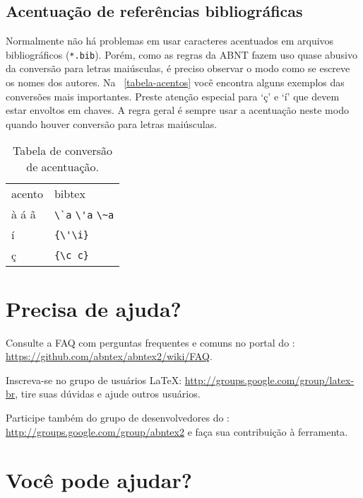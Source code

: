 \subsection{Acentuação de referências bibliográficas}

Normalmente não há problemas em usar caracteres acentuados em arquivos
bibliográficos (\texttt{*.bib}). Porém, como as regras da ABNT fazem uso quase
abusivo da conversão para letras maiúsculas, é preciso observar o modo como se
escreve os nomes dos autores. Na ~\autoref{tabela-acentos} você encontra alguns
exemplos das conversões mais importantes. Preste atenção especial para `ç' e `í'
que devem estar envoltos em chaves. A regra geral é sempre usar a acentuação
neste modo quando houver conversão para letras maiúsculas.

\begin{table}[htbp]
  \caption{Tabela de conversão de acentuação.}
  \label{tabela-acentos}

  \begin{center}
    \begin{tabular}{ll}\hline\hline
      acento & \textsf{bibtex}                                                      \\
      à á ã  & \verb+\`a+ \verb+\'a+ \verb+\~a+ \\
      í      & \verb+{\'\i}+                                               \\
      ç      & \verb+{\c c}+                                               \\
      \hline\hline
    \end{tabular}
  \end{center}
\end{table}


\section{Precisa de ajuda?}

Consulte a FAQ com perguntas frequentes e comuns no portal do \abnTeX:
\url{https://github.com/abntex/abntex2/wiki/FAQ}.

Inscreva-se no grupo de usuários \LaTeX:
\url{http://groups.google.com/group/latex-br}, tire suas dúvidas e ajude
outros usuários.

Participe também do grupo de desenvolvedores do \abnTeX:
\url{http://groups.google.com/group/abntex2} e faça sua contribuição à
ferramenta.

\section{Você pode ajudar?}

